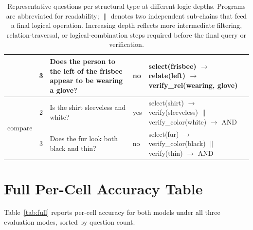 \documentclass[11pt]{article}
\begin{document}
\begin{table}[h]
\begin{tabular}{p{1.1cm} c p{6.2cm} p{1.2cm} p{4.8cm}}
  & 3 & Does the person to the left of the frisbee appear to be wearing a glove? & no
    & select(frisbee) $\to$ relate(left) $\to$ verify\_rel(wearing, glove) \\
\midrule
\multirow{2}{*}{compare}
  & 2 & Is the shirt sleeveless and white? & yes
    & select(shirt) $\to$ verify(sleeveless) $\parallel$ verify\_color(white) $\to$ AND \\
  & 3 & Does the fur look both black and thin? & no
    & select(fur) $\to$ verify\_color(black) $\parallel$ verify(thin) $\to$ AND \\
\bottomrule
\end{tabular}
\caption{Representative questions per structural type at different logic depths. Programs are abbreviated for readability; $\parallel$ denotes two independent sub-chains that feed a final logical operation. Increasing depth reflects more intermediate filtering, relation-traversal, or logical-combination steps required before the final query or verification.}
\label{tab:examples}
\end{table}

\section{Full Per-Cell Accuracy Table}
\label{app:full_table}

Table~\ref{tab:full} reports per-cell accuracy for both models under all three evaluation modes, sorted by question count.
\end{document}
